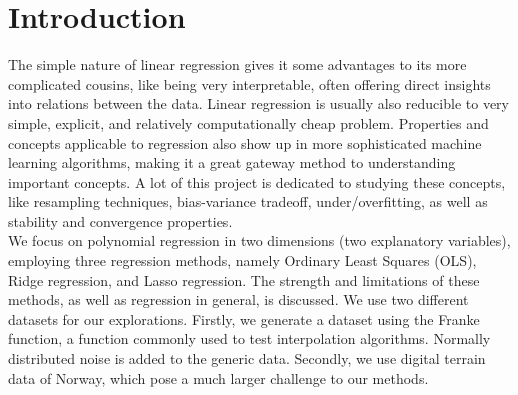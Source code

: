 \documentclass[10pt, twocolumn]{article}
\begin{document}
\vfill

\pagebreak

\restoregeometry

\onecolumn
\tableofcontents
\twocolumn
\pagebreak

\section{Introduction}
The simple nature of linear regression gives it some advantages to its more complicated cousins, like being very interpretable, often offering direct insights into relations between the data. Linear regression is usually also reducible to very simple, explicit, and relatively computationally cheap problem. Properties and concepts applicable to regression also show up in more sophisticated machine learning algorithms, making it a great gateway method to understanding important concepts. A lot of this project is dedicated to studying these concepts, like resampling techniques, bias-variance tradeoff, under/overfitting, as well as stability and convergence properties.
\\

We focus on polynomial regression in two dimensions (two explanatory variables), employing three regression methods, namely Ordinary Least Squares (OLS), Ridge regression, and Lasso regression. The strength and limitations of these methods, as well as regression in general, is discussed. We use two different datasets for our explorations. Firstly, we generate a dataset using the Franke function, a function commonly used to test interpolation algorithms. Normally distributed noise is added to the generic data. Secondly, we use digital terrain data of Norway, which pose a much larger challenge to our methods.





\end{document}
